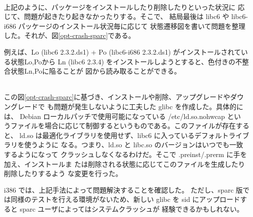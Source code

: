 \documentclass[mingoth,a4paper]{jsarticle}
\newcommand{\subsubsubsection}[1]{%
\vspace{1zw}{\bf #1}\\}
\begin{document}
   \subsubsubsection{状態遷移図の登場}

    上記のように、パッケージをインストールしたり削除したりといった状況に
    応じて、問題が起きたり起きなかったりする。そこで、
    結局最後は libc6 や libc6-i686 パッケージのインストール状況毎に応じて
    状態遷移図を書いて問題を整理した。それが、図\ref{opt-crash-sparc}である。

    例えば、Lo (libc6 2.3.2.ds1) + Po (libc6-i686 2.3.2.ds1) がインストールされている状態Lo,Poから
    Ln (libc6 2.3.4) をインストールしようとすると、色付きの不整合状態Ln,Poに陥ることが
    図から読み取ることができる。

   \subsubsubsection{解決策}

    この図\ref{opt-crash-sparc}に基づき、インストールや削除、アップグレードやダウングレードで
    も問題が発生しないように工夫した glibc を作成した。具体的には、
    Debian ローカルパッチで使用可能になっている /etc/ld.so.nohwcap とい
    うファイルを場合に応じて制御するというものである。このファイルが存在すると、
    ld.so は最適化ライブラリを使用せず、libc6 に入っているデフォルトライブラリを使うように
    なる。つまり、ld.so と libc.so のバージョンはいつでも一致するようになって
    クラッシュしなくなるわけだ。そこで .preinst/.prerm に手を加え、インストールま
    たは削除される状態に応じてこのファイルを生成したり削除したりするよう
    な変更を行った。

    i386 では、上記手法によって問題解決することを確認した。
    ただし、sparc 版では同様のテストを行える環境がないため、新しい glibc を
    sid にアップロードすると sparc ユーザによってはシステムクラッシュが
    経験できるかもしれない。
\end{document}
